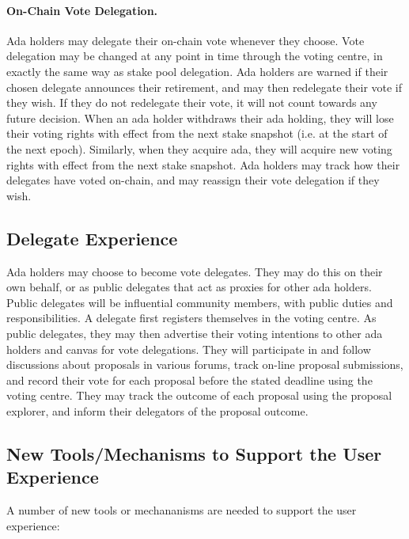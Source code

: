 \paragraph{On-Chain Vote Delegation.}

Ada holders may delegate their on-chain vote whenever they choose.  Vote delegation may be changed at any point in time through the voting centre, in
exactly the same way as stake pool delegation.  Ada holders are warned if their chosen delegate announces their retirement, and may then redelegate their vote if they
wish.  If they do not redelegate their vote, it will not count towards any future decision.
When an ada holder withdraws their ada holding, they will lose their voting rights with effect from the next stake snapshot (i.e. at the start of the next
epoch).  Similarly, when they acquire ada, they will acquire new voting rights with effect from the next stake snapshot.
Ada holders may track how their delegates have voted on-chain, and may reassign their vote delegation if they wish.

\subsection{Delegate Experience}

Ada holders may choose to become vote delegates.  They may do this on their own behalf, or as public delegates that act as proxies for other ada holders.
Public delegates will be influential community members, with public duties and responsibilities.
A delegate first registers themselves in the voting centre.  As public delegates, they may then advertise their voting intentions to other ada holders and canvas for vote delegations.
They will participate in and follow discussions about proposals in various forums, track on-line proposal submissions, and
record their vote for each proposal before the stated deadline using the voting centre.  They may track the outcome of each proposal using the proposal explorer, and inform their
delegators of the proposal outcome.

\subsection{New Tools/Mechanisms to Support the User Experience}

A number of new tools or mechananisms are needed to support the user experience:

